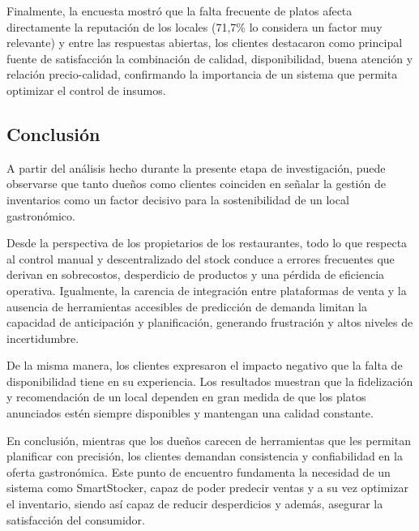 Finalmente, la encuesta mostró que la falta frecuente de platos afecta directamente la reputación de los locales (71,7\% lo considera un factor muy relevante) y entre las respuestas abiertas, los clientes destacaron como principal fuente de satisfacción la combinación de calidad, disponibilidad, buena atención y relación precio-calidad, confirmando la importancia de un sistema que permita optimizar el control de insumos.

\subsection{Conclusión}\label{sec:sintesis-user-research}

A partir del análisis hecho durante la presente etapa de investigación, puede observarse que tanto dueños como clientes coinciden en señalar la gestión de inventarios como un factor decisivo para la sostenibilidad de un local gastronómico. 

Desde la perspectiva de los propietarios de los restaurantes, todo lo que respecta al control manual y descentralizado del stock conduce a errores frecuentes que derivan en sobrecostos, desperdicio de productos y una pérdida de eficiencia operativa. Igualmente, la carencia de integración entre plataformas de venta y la ausencia de herramientas accesibles de predicción de demanda limitan la capacidad de anticipación y planificación, generando frustración y altos niveles de incertidumbre.

De la misma manera, los clientes expresaron el impacto negativo que la falta de disponibilidad tiene en su experiencia. Los resultados muestran que la fidelización y recomendación de un local dependen en gran medida de que los platos anunciados estén siempre disponibles y mantengan una calidad constante.

En conclusión, mientras que los dueños carecen de herramientas que les permitan planificar con precisión, los clientes demandan consistencia y confiabilidad en la oferta gastronómica. Este punto de encuentro fundamenta la necesidad de un sistema como SmartStocker, capaz de poder predecir ventas y a su vez optimizar el inventario, siendo así capaz de reducir desperdicios y además, asegurar la satisfacción del consumidor.
